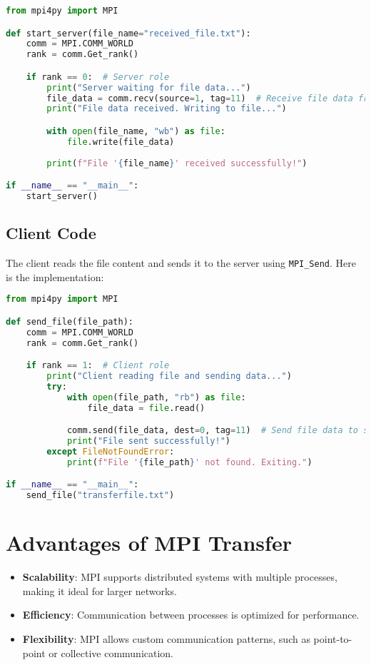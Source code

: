 \documentclass[a4paper,12pt]{article}
\begin{document}
\begin{lstlisting}[language=Python]
from mpi4py import MPI

def start_server(file_name="received_file.txt"):
    comm = MPI.COMM_WORLD
    rank = comm.Get_rank()

    if rank == 0:  # Server role
        print("Server waiting for file data...")
        file_data = comm.recv(source=1, tag=11)  # Receive file data from client
        print("File data received. Writing to file...")

        with open(file_name, "wb") as file:
            file.write(file_data)
        
        print(f"File '{file_name}' received successfully!")

if __name__ == "__main__":
    start_server()
\end{lstlisting}

\subsection{Client Code}
The client reads the file content and sends it to the server using \texttt{MPI\_Send}. Here is the implementation:

\begin{lstlisting}[language=Python]
from mpi4py import MPI

def send_file(file_path):
    comm = MPI.COMM_WORLD
    rank = comm.Get_rank()

    if rank == 1:  # Client role
        print("Client reading file and sending data...")
        try:
            with open(file_path, "rb") as file:
                file_data = file.read()

            comm.send(file_data, dest=0, tag=11)  # Send file data to server
            print("File sent successfully!")
        except FileNotFoundError:
            print(f"File '{file_path}' not found. Exiting.")

if __name__ == "__main__":
    send_file("transferfile.txt")
\end{lstlisting}

\section{Advantages of MPI Transfer}
\begin{itemize}
    \item \textbf{Scalability}: MPI supports distributed systems with multiple processes, making it ideal for larger networks.
    \item \textbf{Efficiency}: Communication between processes is optimized for performance.
    \item \textbf{Flexibility}: MPI allows custom communication patterns, such as point-to-point or collective communication.
\end{itemize}
\end{document}

